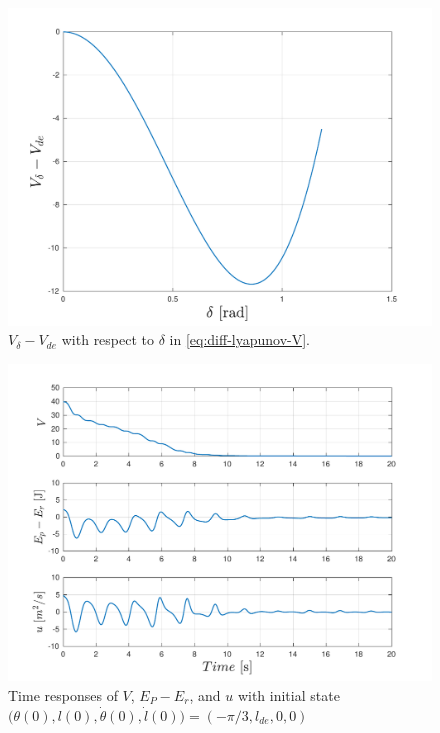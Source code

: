 \documentclass[main.tex]{subfiles}
\begin{document}
\begin{figure}[H]
    \centering
    \includegraphics[scale = 0.6]{figures/Partial_Energy_Shaping/partial_3.pdf}
    \caption{$V_{\delta}-V_{de}$ with respect to $\delta$ in \eqref{eq:diff-lyapunov-V}.}
    \label{fig:partial_3}
\end{figure}
\begin{figure}[H]
    \centering
    \includegraphics[scale = 0.6]{figures/Partial_Energy_Shaping/partial_1b.pdf}
    \caption{Time responses of $V$, $E_P-E_r$, and $u$ with initial state  $\big(\theta(0),l(0),\dot{\theta}(0),\dot{l}(0)\big) = (-\pi/3,l_{de},0,0)$}
    \label{fig:partial_1b}
\end{figure}
\end{document}
